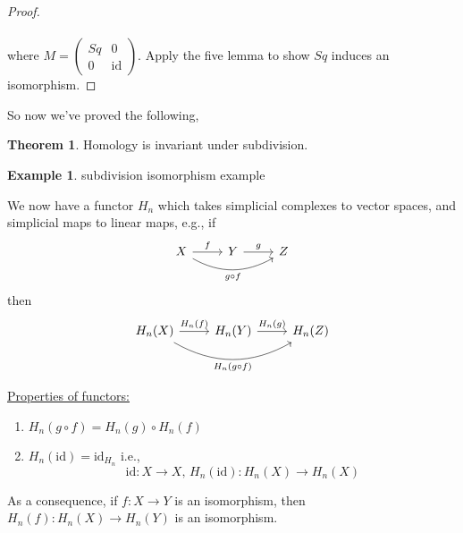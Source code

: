 \documentclass[a4paper,14pt]{extarticle}
\theoremstyle{definition}
\newtheorem*{theorem}{Theorem}
\newtheorem*{eg}{Example}
\begin{document}
\begin{proof} \[\]
	 \\
	\vspace{12pt}
	where $M=\begin{pmatrix}Sq&0\\0&\text{id}\end{pmatrix}$. Apply the five lemma to show 
	$Sq$ induces an isomorphism.
\end{proof}
So now we've proved the following,

\begin{theorem}
	Homology is invariant under subdivision.
\end{theorem}

\begin{eg}
	subdivision isomorphism example
\end{eg}

We now have a functor $H_n$ which takes simplicial complexes to vector spaces, and 
simplicial maps to linear maps, e.g.,
if 
\[\begin{tikzcd}
	X\ar[r,"f"]\ar[rr,out=-30,in=210,swap,"g\circ f"] & Y\ar[r,"g"] & Z
	\end{tikzcd}\]
then
\[\begin{tikzcd}
	H_n(X)\ar[r,"H_n(f)"]\ar[rr,out=-30,in=210,swap,"H_n(g\circ f)"] & H_n(Y)\ar[r,"H_n(g)"] & 
	H_n(Z)
	\end{tikzcd}\]

\noindent\underline{Properties of functors:}
\begin{enumerate}
	\item $H_n(g\circ f)=H_n(g)\circ H_n(f)$
	\item $H_n(\text{id})=\text{id}_{H_n}$ i.e., \[\text{id}:X\rightarrow X, \,
	H_n(\text{id}):H_n(X)\rightarrow H_n(X)\]
\end{enumerate}

As a consequence, if $f:X\rightarrow Y$ is an isomorphism, then
$H_n(f):H_n(X)\rightarrow H_n(Y)$ is an isomorphism.
\end{document}
